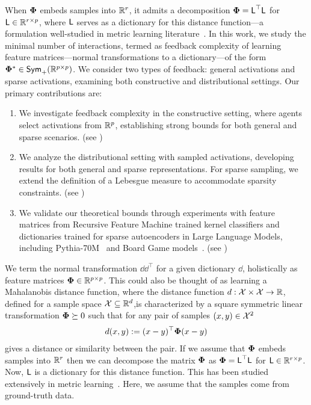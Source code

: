 When $\pphi$ embeds samples into $\reals^r$, it admits a decomposition $\pphi = \sf{L}^\top\sf{L}$ for $\sf{L} \in \reals^{r \times p}$, where $\sf{L}$ serves as a dictionary for this distance function—a formulation well-studied in metric learning literature~\citep{kulis_ml}.
In this work, we study the minimal number of interactions, termed as feedback complexity of learning feature matrices—normal transformations to a dictionary—of the form $\pphi^* \in \symmp$. We consider two types of feedback: general activations and sparse activations, examining both constructive and distributional settings. Our primary contributions are:\vspace{-2mm}
\begin{enumerate}[label={\Roman*.},leftmargin=*]
\item We investigate feedback complexity in the constructive setting, where agents select activations from $\reals^p$, establishing strong bounds for both general and sparse scenarios. (see )
\item We analyze the distributional setting with sampled activations, developing results for both general and sparse representations. For sparse sampling, we extend the definition of a Lebesgue measure to accommodate sparsity constraints. (see )
\item We validate our theoretical bounds through experiments with feature matrices from Recursive Feature Machine trained kernel classifiers and dictionaries trained for sparse autoencoders in Large Language Models, including Pythia-70M~\citep{pythia} and Board Game models~\citep{karvonen2024measuring}. (see )
\end{enumerate}
\iffalse
We term the normal transformation $\dd\dd^\top$ for a given dictionary $\dd$, holistically as feature matrices $\pphi \in \reals^{p \times p}$.
This could also be thought of as learning a Mahalanobis distance function, where the distance function $d: \cX \times \cX \to \reals$, defined for a sample space $\cX \subseteq \reals^d$,is characterized by a square symmetric linear transformation $\pphi \succeq 0$ such that for any pair of samples $(x,y) \in \cX^{2}$
\begin{align*}
    d(x,y) := (x - y)^{\top} \pphi (x-y)
\end{align*}
gives a distance or similarity between the pair. If we assume that $\pphi$ embeds samples into $\reals^r$ then we can decompose the matrix $\pphi$ as $\pphi = \sf{L}^\top\sf{L}$
for $\sf{L} \in \reals^{r \times p}$. Now, $\sf{L}$ is a dictionary for this distance function. This has been studied extensively in metric learning~\citep{kulis_ml}. Here, we assume that the samples come from ground-truth data.


